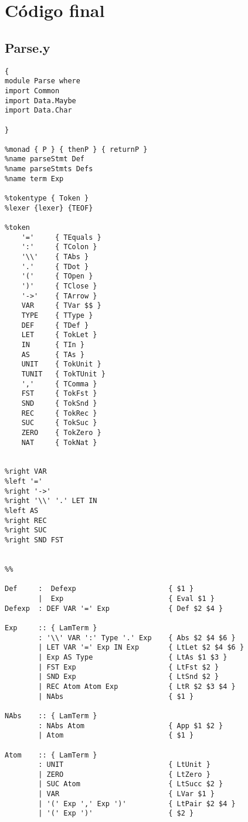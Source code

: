 \documentclass[a4paper]{report}
\begin{document}
\section*{C\'odigo final}
\subsection*{Parse.y}

\begin{lstlisting}
{
module Parse where
import Common
import Data.Maybe
import Data.Char

}

%monad { P } { thenP } { returnP }
%name parseStmt Def
%name parseStmts Defs
%name term Exp

%tokentype { Token }
%lexer {lexer} {TEOF}

%token
    '='     { TEquals }
    ':'     { TColon }
    '\\'    { TAbs }
    '.'     { TDot }
    '('     { TOpen }
    ')'     { TClose }
    '->'    { TArrow }
    VAR     { TVar $$ }
    TYPE    { TType }
    DEF     { TDef }
    LET     { TokLet }
    IN      { TIn }
    AS      { TAs }
    UNIT    { TokUnit }
    TUNIT   { TokTUnit }
    ','     { TComma }
    FST     { TokFst }
    SND     { TokSnd }
    REC     { TokRec }
    SUC     { TokSuc }
    ZERO    { TokZero }
    NAT     { TokNat }
    

%right VAR
%left '=' 
%right '->'
%right '\\' '.' LET IN
%left AS 
%right REC
%right SUC
%right SND FST


%%

Def     :  Defexp                      { $1 }
        |  Exp                         { Eval $1 }
Defexp  : DEF VAR '=' Exp              { Def $2 $4 } 

Exp     :: { LamTerm }
        : '\\' VAR ':' Type '.' Exp    { Abs $2 $4 $6 }
        | LET VAR '=' Exp IN Exp       { LtLet $2 $4 $6 }
        | Exp AS Type                  { LtAs $1 $3 }
        | FST Exp                      { LtFst $2 }
        | SND Exp                      { LtSnd $2 }
        | REC Atom Atom Exp            { LtR $2 $3 $4 }
        | NAbs                         { $1 }
        
NAbs    :: { LamTerm }
        : NAbs Atom                    { App $1 $2 }
        | Atom                         { $1 }

Atom    :: { LamTerm }
        : UNIT                         { LtUnit }
        | ZERO                         { LtZero }
        | SUC Atom                     { LtSucc $2 }
        | VAR                          { LVar $1 }
        | '(' Exp ',' Exp ')'          { LtPair $2 $4 }
        | '(' Exp ')'                  { $2 }


\end{lstlisting}
\end{document}
